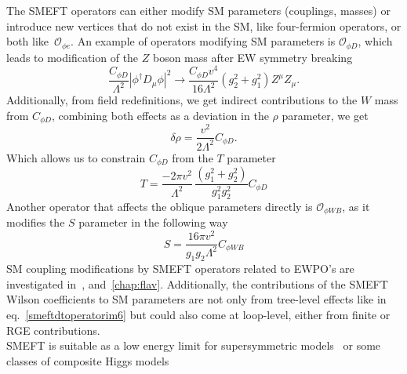 The SMEFT operators can either modify SM parameters (couplings, masses) or introduce new vertices that do not exist in the SM, like four-fermion operators, or both like~$\mathcal{O}_{\phi e}$. An example of operators modifying SM parameters is $ \mathcal O_{\phi D}$, which leads to modification of the $Z$ boson mass after EW symmetry breaking 
\begin{equation}
	\frac{C_{\phi D}}{\Lambda^2} | \phi^\dagger D_\mu \phi |^2 \to \frac{C_{\phi D} v^4}{16 \Lambda^2 } (g_2^2+g_1^2) Z^\mu Z_\mu.
	\label{smeftdtoperatorim6}
\end{equation}
Additionally, from field redefinitions, we get indirect contributions to the $W$ mass from $C_{\phi D}$, combining both effects as a deviation in the $\rho$ parameter, we get
\begin{equation}
	\delta \rho = \frac{v^2}{2 \Lambda^2} C_{\phi D}.
	\label{rhosmeft}
\end{equation}
Which allows us to constrain $C_{\phi D}$ from the $T$ parameter 
\begin{equation}
	T = \frac{-2 \pi v^2}{\Lambda^2} \, \frac{(g_1^2 +g_2^2)}{g_1^2g_2^2} C_{\phi D}
	\label{smeftT}
\end{equation}
Another operator that affects the oblique parameters directly is $\mathcal{O}_{\phi W B}$, as it modifies the $S$ parameter in the following way
\begin{equation}
	S =\frac{16 \pi v^2}{g_1 g_2 \Lambda^2} C_{\phi W B}
	\label{smeftS}
\end{equation}
SM coupling modifications by SMEFT operators related to EWPO's are investigated in~\cite{Alasfar:2020mne}, and~\autoref{chap:flav}. Additionally, the contributions of the SMEFT Wilson coefficients to SM parameters are not only from tree-level effects like in eq.~\eqref{smeftdtoperatorim6} but could also come at loop-level, either from finite or RGE contributions.\\
SMEFT is suitable as a low energy limit for supersymmetric models~\cite{CARENA200363} or some classes of composite Higgs models~\cite{Contino:2010rs,Panico:2015jxa}

